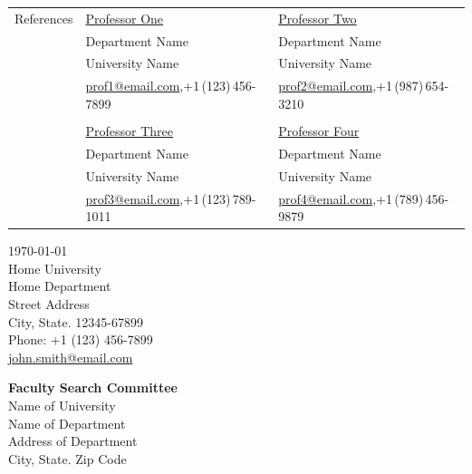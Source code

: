 \documentclass[letterpaper,11pt,oneside]{article}
\begin{document}
\newpage


\noindent \begin{tabular}{@{} l l l}
 \Large{References} & \href{http://www.professorone.com}{Professor One} & \href{http://www.professortwo.com}{Professor Two} \\
 & Department Name &  Department Name  \\
 & University Name &  University Name \\
 & \small{\href{mailto:prof1@email.com}{prof1@email.com},+1\,(123)\,456-7899} & \small{\href{mailto:prof2@email.com}{prof2@email.com},+1\,(987)\,654-3210} \\
&& \\
 & \href{http://www.professorthree.com}{Professor Three} & \href{http://www.professorfour.com}{Professor Four}  \\
 & Department Name &  Department Name \\
 & University Name &  University Name \\
 & \small{\href{mailto:prof3@email.com}{prof3@email.com},+1\,(123)\,789-1011} & \small{\href{mailto:prof4@email.com}{prof4@email.com},+1\,(789)\,456-9879} \\
\end{tabular}



\clearpage
\setlength\parindent{0cm}



\begin{flushright}
 \today                           \\
 \vspace{1em}                              
 Home University            \\
 Home Department                  \\
 Street Address                       \\
 City, State. 12345-67899   \\
 Phone: +1 (123) 456-7899         \\
\href{mailto:john.smith@email.com}{john.smith@email.com}  \\ %
\end{flushright}


\begin{flushleft}
 \textbf{Faculty Search Committee}         \\
 Name of University \\
Name of Department                  \\
Address of Department \\
City, State. Zip Code
\end{flushleft}
\end{document}
